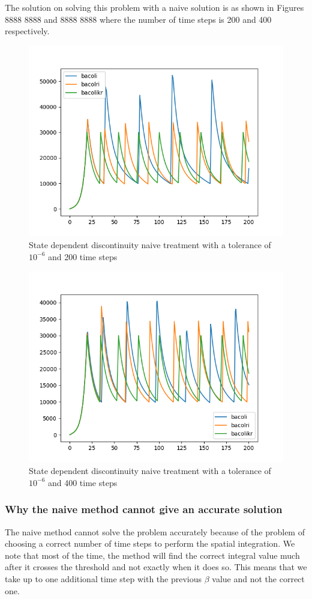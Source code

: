\documentclass{article}
\begin{document}
The solution on solving this problem with a naive solution is as shown in Figures 8888 8888 and 8888 8888 where the number of time steps is 200 and 400 respectively. 

\begin{figure}[H]
\centering
\includegraphics[width=0.7\linewidth]{./figures/pde_state_disc_naive_200}
\caption{State dependent discontinuity naive treatment with a tolerance of $10^{-6}$ and 200 time steps}
\label{fig:pde_state_disc_naive_200}
\end{figure}

\begin{figure}[H]
\centering
\includegraphics[width=0.7\linewidth]{./figures/pde_state_disc_naive_400}
\caption{State dependent discontinuity naive treatment with a tolerance of $10^{-6}$ and 400 time steps}
\label{fig:pde_state_disc_naive_400}
\end{figure}

\subsubsection{Why the naive method cannot give an accurate solution}
The naive method cannot solve the problem accurately because of the problem of choosing a correct number of time steps to perform the spatial integration. We note that most of the time, the method will find the correct integral value much after it crosses the threshold and not exactly when it does so. This means that we take up to one additional time step with the previous $\beta$ value and not the correct one.
\end{document}
